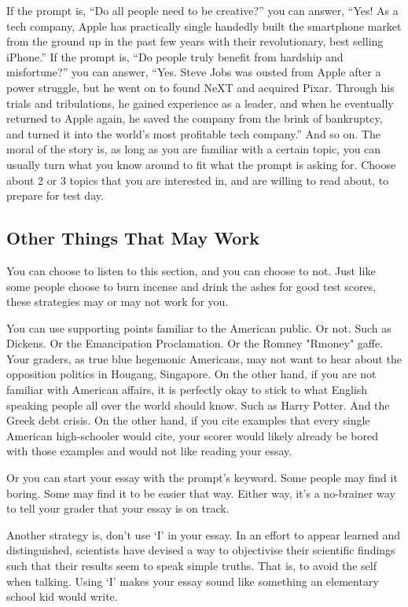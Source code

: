 \documentclass[DIV=calc,11pt,parskip,numbers=noenddot]{scrartcl} %
\begin{document}
If the prompt is, “Do all people need to be creative?” you can answer, “Yes! As a tech company, Apple has practically single handedly built the smartphone market from the ground up in the past few years with their revolutionary, best selling iPhone.” If the prompt is, “Do people truly benefit from hardship and misfortune?” you can answer, “Yes. Steve Jobs was ousted from Apple after a power struggle, but he went on to found NeXT and acquired Pixar. Through his trials and tribulations, he gained experience as a leader, and when he eventually returned to Apple again, he saved the company from the brink of bankruptcy, and turned it into the world’s most profitable tech company.” And so on. The moral of the story is, as long as you are familiar with a certain topic, you can usually turn what you know around to fit what the prompt is asking for. Choose about 2 or 3 topics that you are interested in, and are willing to read about, to prepare for test day.
\subsection{Other Things That May Work}
You can choose to listen to this section, and you can choose to not. Just like some people choose to burn incense and drink the ashes for good test scores, these strategies may or may not work for you.

You can use supporting points familiar to the American public. Or not. Such as Dickens. Or the Emancipation Proclamation. Or the Romney "Rmoney" gaffe. Your graders, as true blue hegemonic Americans, may not want to hear about the opposition politics in Hougang, Singapore. On the other hand, if you are not familiar with American affairs, it is perfectly okay to stick to what English speaking people all over the world should know. Such as Harry Potter. And the Greek debt crisis. On the other hand, if you cite examples that every single American high-schooler would cite, your scorer would likely already be bored with those examples and would not like reading your essay.

Or you can start your essay with the prompt’s keyword. Some people may find it boring. Some may find it to be easier that way. Either way, it’s a no-brainer way to tell your grader that your essay is on track.

Another strategy is, don’t use ‘I’ in your essay. In an effort to appear learned and distinguished, scientists have devised a way to objectivise their scientific findings such that their results seem to speak simple truths. That is, to avoid the self when talking. Using ‘I’ makes your essay sound like something an elementary school kid would write. 
\end{document}
